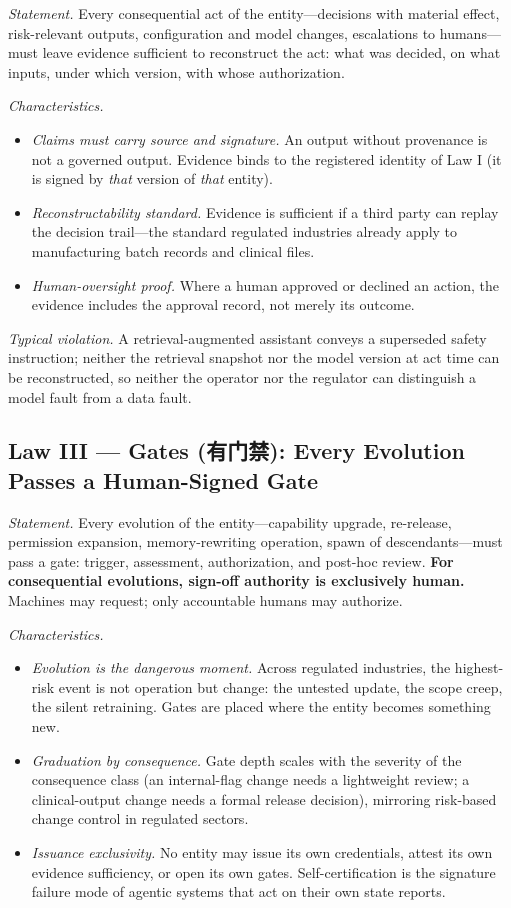 \documentclass[12pt]{article}
\begin{document}
\emph{Statement.} Every consequential act of the entity---decisions with material effect, risk-relevant outputs, configuration and model changes, escalations to humans---must leave evidence sufficient to reconstruct the act: what was decided, on what inputs, under which version, with whose authorization.

\emph{Characteristics.}
\begin{itemize}[itemsep=1pt]
  \item \emph{Claims must carry source and signature.} An output without provenance is not a governed output. Evidence binds to the registered identity of Law I (it is signed by \emph{that} version of \emph{that} entity).
  \item \emph{Reconstructability standard.} Evidence is sufficient if a third party can replay the decision trail---the standard regulated industries already apply to manufacturing batch records and clinical files.
  \item \emph{Human-oversight proof.} Where a human approved or declined an action, the evidence includes the approval record, not merely its outcome.
\end{itemize}

\emph{Typical violation.} A retrieval-augmented assistant conveys a superseded safety instruction; neither the retrieval snapshot nor the model version at act time can be reconstructed, so neither the operator nor the regulator can distinguish a model fault from a data fault.

\subsection{Law III --- Gates (有门禁): Every Evolution Passes a Human-Signed Gate}

\emph{Statement.} Every evolution of the entity---capability upgrade, re-release, permission expansion, memory-rewriting operation, spawn of descendants---must pass a gate: trigger, assessment, authorization, and post-hoc review. \textbf{For consequential evolutions, sign-off authority is exclusively human.} Machines may request; only accountable humans may authorize.

\emph{Characteristics.}
\begin{itemize}[itemsep=1pt]
  \item \emph{Evolution is the dangerous moment.} Across regulated industries, the highest-risk event is not operation but change: the untested update, the scope creep, the silent retraining. Gates are placed where the entity becomes something new.
  \item \emph{Graduation by consequence.} Gate depth scales with the severity of the consequence class (an internal-flag change needs a lightweight review; a clinical-output change needs a formal release decision), mirroring risk-based change control in regulated sectors.
  \item \emph{Issuance exclusivity.} No entity may issue its own credentials, attest its own evidence sufficiency, or open its own gates. Self-certification is the signature failure mode of agentic systems that act on their own state reports.
\end{itemize}
\end{document}
